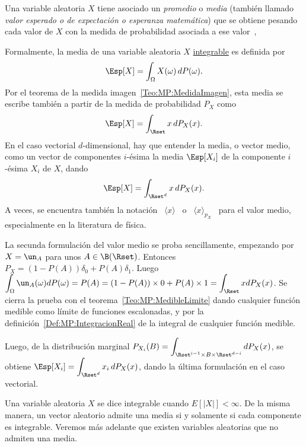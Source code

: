 Una  variable aleatoria  $X$  tiene asociado  un  {\it promedio}  o {\it  media}
(tambi\'en  llamado   {\it  valor  esperado  o  de   expectaci\'on  o  esperanza
  matem\'atica})  que se  obtiene pesando  cada valor  de $X$  con la  medida de
probabilidad asociada a ese valor~\cite{AshDol99, AthLah06},
%
\begin{definicion}
\label{Def:MP:ValorMedio}
%
  Formalmente, la media de  una variable aleatoria $X$ \underline{integrable} es
  definida por
  \[
  \Esp[X] = \int_\Omega X(\omega) \, dP(\omega).
  \]
  Por    el    teorema    de    la    medida    imagen~\ref{Teo:MP:MedidaImagen},
  esta media  se escribe tambi\'en a  partir de la medida  de probabilidad $P_X$
  como
  \[
  \Esp[X] = \int_\Rset x \, dP_X(x).
  \]
  En  el caso vectorial  $d$-dimensional, hay  que entender  la media,  o vector
  medio, como  un vector de componentes  $i$-\'esima la media  $\Esp[X_i]$ de la
  componente $i$-\'esima $X_i$ de $X$, dando
  \[
  \Esp[X] = \int_{\Rset^d} x \, dP_X(x).
  \]
  A veces,  se encuentra  tambi\'en la notaci\'on  \ $\langle  x \rangle$ \  o \
  $\langle  x  \rangle_{p_X}$  \  para  el  valor  medio,  especialmente  en  la
  literatura de f\'isica.
\end{definicion}
%
La secunda formulaci\'on  del valor medio se proba  sencillamente, empezando por
$X =  \un_A$ para unos $A \in  \B(\Rset)$.  Entonces $P_X =  (1-P(A)) \delta_0 +
P(A)  \delta_1$.  Luego  $\displaystyle \int_\Omega  \un_A(\omega)  dP(\omega) =
P(A) = (1-P(A)) \times 0 + P(A)  \times 1 = \int_\Rset x dP_X(x)$.  Se cierra la
prueba  con  el  teorema~\ref{Teo:MP:MedibleLimite}  dando  cualquier  funci\'on
medible    como    l\'imite    de    funciones    escalonadas,    y    por    la
definici\'on~\ref{Def:MP:IntegracionReal} de la  integral de cualquier funci\'on
medible.

Luego,   de    la   distribuci\'on   marginal    $\displaystyle   P_{X_i}(B)   =
\int_{\Rset^{i-1}   \times   B   \times   \Rset^{d-i}}  dP_X(x)$,   se   obtiene
$\displaystyle  \Esp[X_i] = \int_{\Rset^d}  x_i \,  dP_X(x)$, dando  la \'ultima
formulaci\'on en el caso vectorial.

Una variable  aleatoria $X$ se dice  integrable cuando $E[|X|] <  \infty$. De la
misma  manera, un  vector aleatorio  admite  una media  si y  solamente si  cada
componente  es   integrable.  Veremos  m\'as  adelante   que  existen  variables
aleatorias que no admiten una media.

